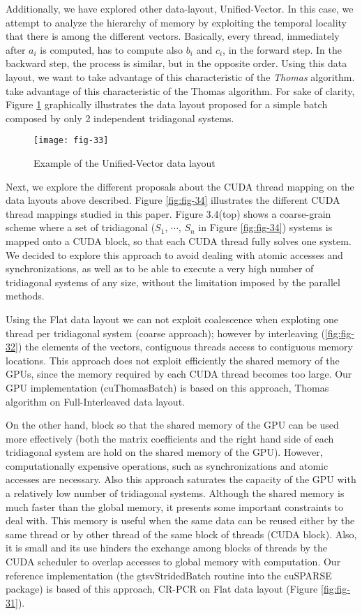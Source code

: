 Additionally, we have explored other data-layout, Unified-Vector. In this case, we
attempt to analyze the hierarchy of memory by exploiting the temporal locality that
there is among the different vectors. Basically, every
thread, immediately after $a_i$ is computed, has to compute also 
$b_i$ and $c_i$, in the forward step. In the backward step, the process
is similar, but in the opposite order. Using this data layout, we want to take advantage of
this characteristic of the \textit{Thomas} algorithm.
take advantage of this characteristic of the Thomas algorithm.
For sake of clarity, Figure \ref{fig:fig-33} 
graphically illustrates the data layout proposed for a simple batch 
composed by only 2 independent tridiagonal systems.

\begin{figure}[htbp]
    \centering
    \texttt{[image: fig-33]}
    \caption{Example of the Unified-Vector data layout}
    \label{fig:fig-33}
\end{figure}

Next, we explore the different proposals about the CUDA thread mapping on the
data layouts above described. Figure \ref{fig:fig-34} illustrates the different CUDA thread mappings studied in this paper. Figure 3.4(top) shows a coarse-grain scheme where a set of
tridiagonal ($S_1$, $\cdots$, $S_n$ in Figure \ref{fig:fig-34}) systems
 is mapped onto a CUDA block, so that each CUDA thread fully solves one system. We decided to explore this approach to avoid
 dealing with atomic accesses and synchronizations, as well as to be able to execute a
 very high number of tridiagonal systems of any size, without the limitation imposed by
 the parallel methods.

 Using the Flat data layout we can not exploit coalescence when exploting one thread per tridiagonal
 system (coarse approach); however by interleaving (\ref{fig:fig-32}) the elements of the 
 vectors, contiguous threads access to contiguous memory locations. This approach does not
 exploit efficiently the shared memory of the GPUs, since the memory required by each
 CUDA thread becomes too large. Our GPU implementation (cuThomasBatch) is based on this approach,
 Thomas algorithm on Full-Interleaved data layout.

 On the other hand, block so that the shared memory of the GPU can be used more effectively (both the
 matrix coefficients and the right hand side of each tridiagonal system are hold on the
 shared memory of the GPU). However, computationally expensive operations, such as
 synchronizations and atomic accesses are necessary. Also this approach saturates the
 capacity of the GPU with a relatively low number of tridiagonal systems. Although the
 shared memory is much faster than the global memory, it presents some important 
 constraints to deal with. This memory is useful when the same data can be reused either by
 the same thread or by other thread of the same block of threads (CUDA block). Also,
 it is small and its use hinders the exchange
 among blocks of threads by the CUDA scheduler to overlap accesses to global memory
 with computation. Our reference implementation (the gtsvStridedBatch routine into
 the cuSPARSE package) is based of this approach, CR-PCR on Flat
 data layout (Figure \ref{fig:fig-31}).

